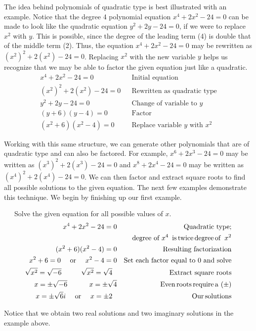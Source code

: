 The idea behind polynomials of quadratic type is best illustrated with an example.  Notice that the degree 4 polynomial equation $x^4+2x^2-24 = 0$ can be made to look like the quadratic equation $y^2+2y-24=0$, if we were to replace $x^2$ with $y$.  This is possible, since the degree of the leading term (4) is double that of the middle term (2).  Thus, the equation $x^4+2x^2-24 = 0$ may be rewritten as $(x^2)^2+2(x^2)-24=0$.  Replacing $x^2$ with the new variable $y$ helps us recognize that we may be able to factor the given equation just like a quadratic.
\begin{eqnarray*}
x^4+2x^2-24 = 0 & & \text{Initial~equation}\\
(x^2)^2+2(x^2)-24 = 0 & & \text{Rewritten~as~quadratic~type}\\
y^2+2y-24 = 0 & & \text{Change~of~variable~to~} y\\
(y+6)(y-4) = 0 & & \text{Factor}\\
(x^2+6)(x^2-4) = 0 & & \text{Replace~variable~} y \text{~with~} x^2
\end{eqnarray*}

Working with this same structure, we can generate other polynomials that are of quadratic type and can also be factored.  For example, $x^6+2x^3-24 = 0$ may be written as $(x^3)^2+2(x^3)-24 = 0$ and $x^8+2x^4-24 = 0$ may be written as $(x^4)^2+2(x^4)-24 = 0$.  We can then factor and extract square roots to find all possible solutions to the given equation.  The next few examples demonstrate this technique.  We begin by finishing up our first example.

\begin{example}~~~Solve the given equation for all possible values of $x$.
  \begin{eqnarray*}
   x^4+2x^2-24 = 0 &  & \operatorname{Quadratic~type;}\\
	& & ~~~\text{degree~of~} x^4 \operatorname{~is} \operatorname{twice} \operatorname{degree} \operatorname{of~} x^2\\
   (x^2+6)(x^2-4)=0 &  & \text{Resulting~factorization}  \\
	 x^2+6=0 \text{~~~~or~~~~} x^2-4=0 &  & \text{Set~each~factor~equal~to~}0 \text{~and~solve} \\
\sqrt{x^2} = \sqrt{-6}~~~~ \,\ \,\ \,\ \sqrt{x^2} = \sqrt{4}~~ &  & \operatorname{Extract~square~roots} \\
		x= \pm{\sqrt{-6}}~~~~~ \,\ \,\ \,\ x= \pm{\sqrt{4}} &  & \operatorname{Even} \operatorname{roots} \operatorname{require} \operatorname{a~} (\pm) \\
		x= \pm{\sqrt{6}i}~~~~ \text{or~~~~}   x=\pm2~~ &  & \operatorname{Our} \operatorname{solutions}
	\end{eqnarray*}
\end{example}
Notice that we obtain two real solutions and two imaginary solutions in the example above.

